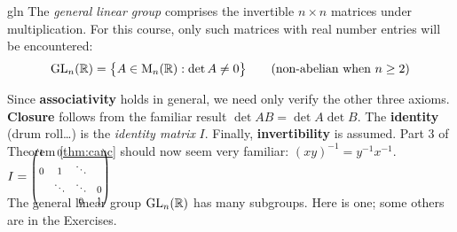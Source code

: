 \begin{example}{}{gln}
	The \emph{general linear group} comprises the invertible $n\times n$ matrices under multiplication. For this course, only such matrices with real number entries will be encountered:
	\[
		\mathrm{GL}_n(\mathbb{R})=\bigl\{A\in \mathrm{M}_n(\mathbb{R}):\det A\neq 0\bigr\} \tag{non-abelian when $n\ge 2$}
	\]
	\begin{minipage}[t]{0.8\linewidth}\vspace{-5pt}
		Since \textbf{associativity} holds in general, we need only verify the other three axioms.\smallbreak
		\textbf{Closure} follows from the familiar result $\det AB=\det A\det B$.\smallbreak
		The \textbf{identity} (drum roll\ldots) is the \emph{identity matrix} $I$.\smallbreak
		Finally, \textbf{invertibility} is assumed. Part 3 of Theorem \ref{thm:canc} should now seem very familiar: $(xy)^{-1}=y^{-1}x^{-1}$.
	\end{minipage}
	\hfill
	\begin{minipage}[t]{0.19\linewidth}\vspace{28pt}
		\flushright$I=\smash{\scalebox{0.8}{%
		$\begin{pmatrix}
			1&0&&\\
			0&1&\ddots&\\
			&\ddots&\ddots&0\\
			&&0&1
		\end{pmatrix}$%
		}}$
	\end{minipage}
\end{example}


\goodbreak



The general linear group $\mathrm{GL}_n(\mathbb{R})$ has many subgroups. Here is one; some others are in the Exercises.

